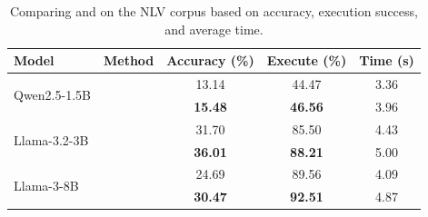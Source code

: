 \begin{table}
    \scriptsize
    \vspace{-.2in}
    \caption{Comparing \Tool{} and \syncode{} on the NLV corpus based on accuracy, execution success, and average time.}
    \vspace{-.03in}
    \begin{tabular}{llccc}
        \toprule
        \textbf{Model} & \textbf{Method} & \textbf{Accuracy (\%)} & \textbf{ Execute (\%)} & \textbf{Time (s)} \\
        \midrule
        \multirow{2}{*}{Qwen2.5-1.5B} 
        & \syncode{} & 13.14 & 44.47 & 3.36 \\
        & \Tool{} & \textbf{15.48} & \textbf{46.56} & 3.96 \\
        \midrule
        \multirow{2}{*}{Llama-3.2-3B} 
        & \syncode{} & 31.70 & 85.50 & 4.43 \\
        & \Tool{} & \textbf{36.01} & \textbf{88.21} & 5.00 \\
        \midrule
        \multirow{2}{*}{Llama-3-8B} 
        & \syncode{} & 24.69 & 89.56 & 4.09 \\
        & \Tool{} & \textbf{30.47} & \textbf{92.51} & 4.87 \\
        \bottomrule
    \end{tabular}
    \label{tab:nlv_comparison}
    \vspace{-.2in}
\end{table}
